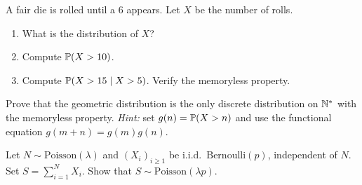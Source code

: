 \begin{exercise}
A fair die is rolled until a 6 appears. Let $X$ be the number of rolls.
\begin{enumerate}[label=(\alph*)]
    \item What is the distribution of $X$?
    \item Compute $\mathbb{P}(X > 10)$.
    \item Compute $\mathbb{P}(X > 15 \mid X > 5)$. Verify the memoryless property.
\end{enumerate}
\end{exercise}

\begin{exercise}
Prove that the geometric distribution is the only discrete distribution on $\mathbb{N}^*$
with the memoryless property.
\textit{Hint:} set $g(n) = \mathbb{P}(X > n)$ and use the functional equation
$g(m+n) = g(m)g(n)$.
\end{exercise}

\begin{exercise}
Let $N \sim \mathrm{Poisson}(\lambda)$ and $(X_i)_{i \geq 1}$ be i.i.d.\
$\mathrm{Bernoulli}(p)$, independent of $N$. Set $S = \sum_{i=1}^{N} X_i$.
Show that $S \sim \mathrm{Poisson}(\lambda p)$.
\end{exercise}
